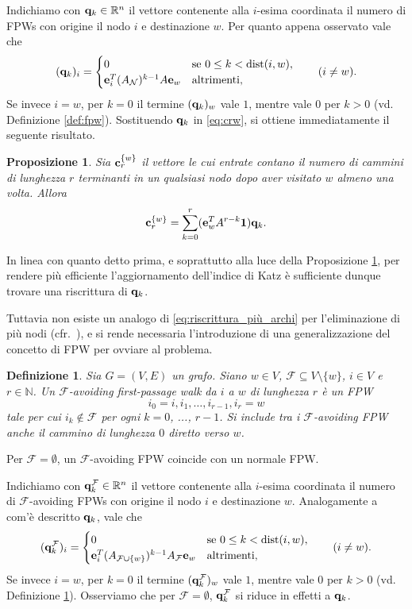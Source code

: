 \documentclass[a4paper]{article}
\newcommand{\dist}{{\rm dist}}
\newcommand{\NN}{\mathbb{N}}
\newcommand{\RR}{\mathbb{R}}
\newcommand{\evec}{{\bf e}}
\newcommand{\cvec}{{\bf c}}
\newcommand{\qvec}{{\bf q}}
\newcommand{\bone}{\mathbf{1}}
\newcommand{\cN}{\mathcal{N}}
\newcommand{\cF}{\mathcal{F}}
\newcommand{\se}{\text{se }}
\newcommand{\altrimenti}{\text{altrimenti}}
\newtheorem{definition}{Definizione}
\newtheorem{proposition}{Proposizione}
\begin{document}
	Indichiamo con $\qvec_k \in \RR^n$ il vettore contenente alla $i$-esima
	coordinata il numero di FPWs con origine il nodo $i$ e destinazione $w$. Per quanto appena
	osservato vale che
	\[
		(\qvec_k)_i = \begin{cases}
		0 & \se 0 \leq k < \dist(i, w), \\
		\evec_i^T (A_\cN)^{k-1} A \evec_w & \altrimenti,
		\end{cases} \qquad (i \neq w).
	\]
	Se invece $i = w$, per $k=0$ il termine $(\qvec_k)_w$ vale $1$, mentre vale $0$ per $k>0$ (vd. Definizione \ref{def:fpw}). Sostituendo $\qvec_k$ in \eqref{eq:crw},
	si ottiene immediatamente il seguente risultato.
	
	\begin{proposition} \label{prop:crw_qk}
		Sia $\cvec_r^{\{w\}}$ il vettore le cui entrate contano il numero
		di cammini di lunghezza $r$ terminanti in un qualsiasi nodo
		dopo aver visitato $w$ almeno una volta. Allora
		\begin{equation}
			\cvec_r^{\{w\}} = \sum_{k=0}^r (\evec_w^T A^{r-k} \bone) \qvec_k.
		\end{equation}
	\end{proposition}
	
	In linea con quanto detto prima, e soprattutto alla luce della Proposizione \ref{prop:crw_qk}, per rendere più efficiente l'aggiornamento dell'indice
	di Katz è sufficiente dunque trovare una riscrittura di $\qvec_k$.
	
	Tuttavia non esiste un analogo di \eqref{eq:riscrittura_più_archi} per
	l'eliminazione di più nodi (cfr.~\cite[p.~8]{katz2024}), e si rende
	necessaria l'introduzione di una generalizzazione del concetto di
	FPW per ovviare al problema.
	
	\begin{definition} \label{def:favoiding_fpw}
		Sia $G = (V, E)$ un grafo. Siano $w \in V$, $\cF \subseteq V \setminus \{w\}$, $i \in V$ e $r \in \NN$. Un $\cF$-avoiding first-passage walk da
		$i$ a $w$ di lunghezza $r$ è un FPW
		\[
			i_0 = i, i_1, \ldots, i_{r-1},  i_r = w
		\]
		tale per cui $i_k \notin \cF$ per ogni $k = 0$, ..., $r-1$. Si include
		tra i $\cF$-avoiding FPW anche il cammino di lunghezza $0$ diretto
		verso $w$.
	\end{definition}
	
	Per $\cF = \emptyset$, un  $\cF$-avoiding FPW coincide con un normale FPW.
	
	Indichiamo con $\qvec_k^\cF \in \RR^n$ il vettore contenente alla $i$-esima
	coordinata il numero di $\cF$-avoiding FPWs con origine il nodo $i$ e
	destinazione $w$. Analogamente a com'è descritto $\qvec_k$, vale che
	\[
		(\qvec_k^\cF)_i = \begin{cases}
		0 & \se 0 \leq k < \dist(i, w), \\
		\evec_i^T (A_{\cF \cup \{w\}})^{k-1} A_\cF \evec_w & \altrimenti,
		\end{cases} \qquad (i \neq w).
	\]
	Se invece $i = w$, per $k=0$ il termine $(\qvec_k^\cF)_w$ vale $1$, mentre vale $0$ per $k>0$ (vd. Definizione \ref{def:favoiding_fpw}). Osserviamo che per $\cF = \emptyset$, $\qvec_k^\cF$ si riduce in effetti a $\qvec_k$.
	
\end{document}
